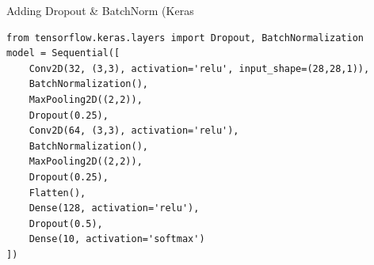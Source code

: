 \documentclass[10pt]{article}
\begin{document}
\begin{example}
Adding Dropout \& BatchNorm (Keras
\begin{verbatim}
from tensorflow.keras.layers import Dropout, BatchNormalization
model = Sequential([
    Conv2D(32, (3,3), activation='relu', input_shape=(28,28,1)),
    BatchNormalization(),
    MaxPooling2D((2,2)),
    Dropout(0.25),
    Conv2D(64, (3,3), activation='relu'),
    BatchNormalization(),
    MaxPooling2D((2,2)),
    Dropout(0.25),
    Flatten(),
    Dense(128, activation='relu'),
    Dropout(0.5),
    Dense(10, activation='softmax')
])
\end{verbatim}
\end{example}
\end{document}
